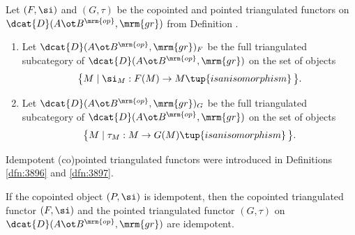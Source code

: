 \begin{dfn} \label{dfn:3997}
Let $(F, \si)$ and $(G, \tau)$ be the copointed and pointed triangulated 
functors on $\dcat{D}(A \ot B^{\mrm{op}}, \mrm{gr})$ from Definition 
\tup{\ref{dfn:3996}}. 
\begin{enumerate}
\item Let $\dcat{D}(A \ot B^{\mrm{op}}, \mrm{gr})_F$ be the full 
triangulated subcategory of $\dcat{D}(A \ot B^{\mrm{op}}, \mrm{gr})$ 
on the set of objects  
\[ \bigr\{ M \mid \si_M : F(M) \to M \tup{ is an isomorphism} \, \bigl\} . \]

\item  Let $\dcat{D}(A \ot B^{\mrm{op}}, \mrm{gr})_G$ be the full 
triangulated subcategory of $\dcat{D}(A \ot B^{\mrm{op}}, \mrm{gr})$ 
on the set of objects 
\[ \bigr\{ M \mid \tau_M : M \to G(M) \tup{ is an isomorphism} \, \bigl\} . \]
\end{enumerate}
\end{dfn}

Idempotent (co)pointed triangulated functors were introduced in Definitions 
\ref{dfn:3896} and \ref{dfn:3897}.

\begin{lem} \label{lem:3995}
If the copointed object  $(P, \si)$ is idempotent, then the copointed 
triangulated functor $(F, \si)$ and the 
pointed triangulated functor $(G, \tau)$ on 
$\dcat{D}(A \ot B^{\mrm{op}}, \mrm{gr})$ are idempotent.
\end{lem}

